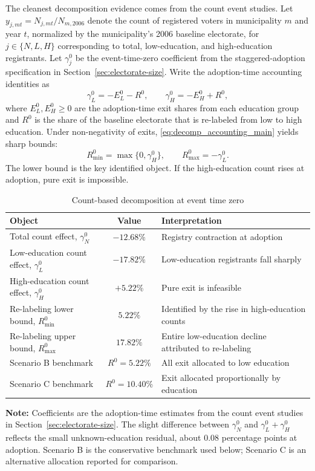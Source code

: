The cleanest decomposition evidence comes from the count event studies. Let $y_{j,mt} = N_{j,mt}/N_{m,2006}$ denote the count of registered voters in municipality $m$ and year $t$, normalized by the municipality's 2006 baseline electorate, for $j \in \{N,L,H\}$ corresponding to total, low-education, and high-education registrants. Let $\gamma_j^0$ be the event-time-zero coefficient from the staggered-adoption specification in Section~\ref{sec:electorate-size}. Write the adoption-time accounting identities as
\begin{equation}
\gamma_L^0 = -E_L^0 - R^0, \qquad \gamma_H^0 = -E_H^0 + R^0,
\label{eq:decomp_accounting_main}
\end{equation}
where $E_L^0,E_H^0 \geq 0$ are the adoption-time exit shares from each education group and $R^0$ is the share of the baseline electorate that is re-labeled from low to high education. Under non-negativity of exits, \eqref{eq:decomp_accounting_main} yields sharp bounds:
\[
R_{\min}^0 = \max\{0,\gamma_H^0\}, \qquad R_{\max}^0 = -\gamma_L^0.
\]
The lower bound is the key identified object. If the high-education count rises at adoption, pure exit is impossible.

\begin{table}[!htbp]
\centering
\caption{Count-based decomposition at event time zero}
\label{tab:decomp_bounds}
\begin{tabular}{lc p{}}
\toprule
Object & Value & Interpretation \\
\midrule
Total count effect, $\gamma_N^0$ & $-12.68\%$ & Registry contraction at adoption \\
Low-education count effect, $\gamma_L^0$ & $-17.82\%$ & Low-education registrants fall sharply \\
High-education count effect, $\gamma_H^0$ & $+5.22\%$ & Pure exit is infeasible \\
\midrule
Re-labeling lower bound, $R_{\min}^0$ & $5.22\%$ & Identified by the rise in high-education counts \\
Re-labeling upper bound, $R_{\max}^0$ & $17.82\%$ & Entire low-education decline attributed to re-labeling \\
Scenario B benchmark & $R^0 = 5.22\%$ & All exit allocated to low education \\
Scenario C benchmark & $R^0 = 10.40\%$ & Exit allocated proportionally by education \\
\bottomrule
\end{tabular}

\vspace{0.75em}
\begin{minipage}{\textwidth}
{\footnotesize \textbf{Note:} Coefficients are the adoption-time estimates from the count event studies in Section~\ref{sec:electorate-size}. The slight difference between $\gamma_N^0$ and $\gamma_L^0 + \gamma_H^0$ reflects the small unknown-education residual, about 0.08 percentage points at adoption. Scenario B is the conservative benchmark used below; Scenario C is an alternative allocation reported for comparison. \par}
\end{minipage}
\end{table}

